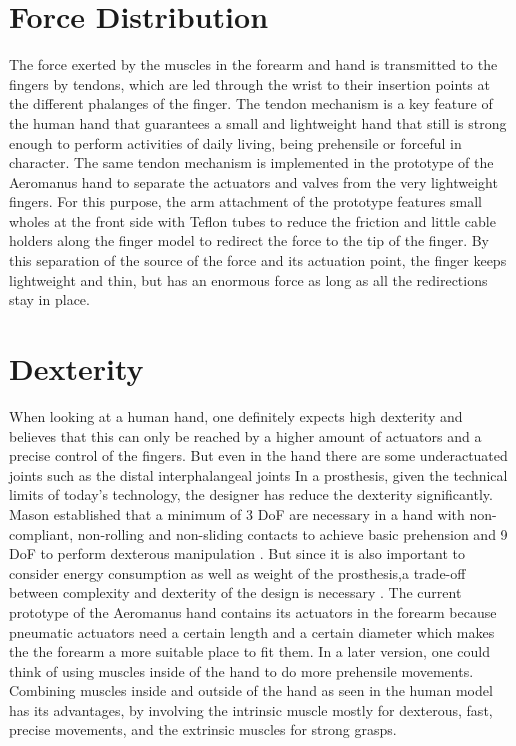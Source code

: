 \documentclass[main]{subfiles}
\begin{document}

\section{Force Distribution}

The force exerted by the muscles in the forearm and hand is transmitted to the fingers by tendons, which are led through the wrist to their insertion points at the different phalanges of the finger. The tendon mechanism is a key feature of the human hand that guarantees a small and lightweight hand that still is strong enough to perform activities of daily living, being prehensile or forceful in character. The same tendon mechanism is implemented in the prototype of the Aeromanus hand to separate the actuators and valves from the very lightweight fingers. For this purpose, the arm attachment of the prototype features small wholes at the front side with Teflon tubes to reduce the friction and little cable holders along the finger model to redirect the force to the tip of the finger. By this separation of the source of the force and its actuation point, the finger keeps lightweight and thin, but has an enormous force as long as all the redirections stay in place.

\section{Dexterity}

When looking at a human hand, one definitely expects high dexterity and believes that this can only be reached by a higher amount of actuators and a precise control of the fingers. But even in the hand there are some underactuated joints such as the distal interphalangeal joints In a prosthesis, given the technical limits of today's technology, the designer has reduce the dexterity significantly. Mason established that a minimum of 3 DoF are necessary in a hand with non-compliant, non-rolling and non-sliding contacts to achieve basic prehension and 9 DoF to perform dexterous manipulation \cite{Mason1985}. But since it is also important to consider energy consumption as well as weight of the prosthesis,a trade-off between complexity and dexterity of the design is necessary \cite{Controzzi2010}. The current prototype of the Aeromanus hand contains its actuators in the forearm because pneumatic actuators need a certain length and a certain diameter which makes the the forearm a more suitable place to fit them. In a later version, one could think of using muscles inside of the hand to do more prehensile movements. Combining muscles inside and outside of the hand as seen in the human model has its advantages, by involving the intrinsic muscle mostly for dexterous, fast, precise movements, and the extrinsic muscles for strong grasps.
\end{document}
